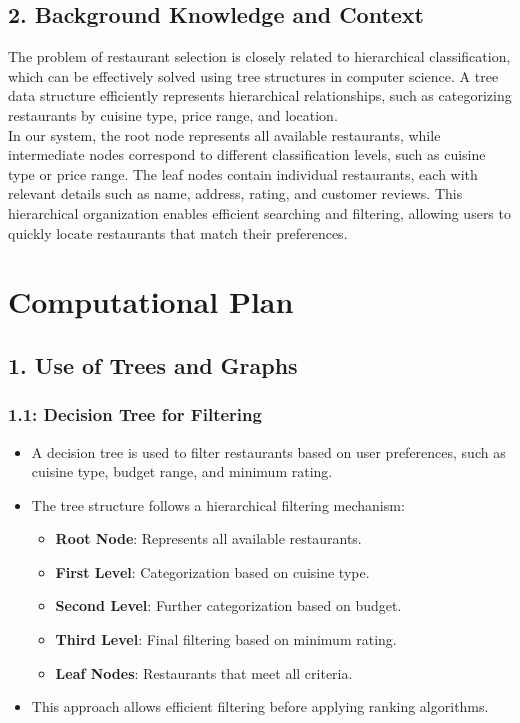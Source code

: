 \documentclass[fontsize=11pt]{article}
\begin{document}
\subsection*{2. Background Knowledge and Context}
The problem of restaurant selection is closely related to hierarchical classification, which can be effectively solved using tree structures in computer science. A tree data structure efficiently represents hierarchical relationships, such as categorizing restaurants by cuisine type, price range, and location. \\
In our system, the root node represents all available restaurants, while intermediate nodes correspond to different classification levels, such as cuisine type or price range. The leaf nodes contain individual restaurants, each with relevant details such as name, address, rating, and customer reviews. This hierarchical organization enables efficient searching and filtering, allowing users to quickly locate restaurants that match their preferences.


\section*{Computational Plan}

\subsection*{1. Use of Trees and Graphs}

\subsubsection*{1.1: Decision Tree for Filtering}
\begin{itemize}
    \item A decision tree is used to filter restaurants based on user preferences, such as cuisine type, budget range, and minimum rating.
    \item The tree structure follows a hierarchical filtering mechanism: 
    \begin{itemize}
        \item \textbf{Root Node}: Represents all available restaurants.
        \item \textbf{First Level}: Categorization based on cuisine type.
        \item \textbf{Second Level}: Further categorization based on budget.
        \item \textbf{Third Level}: Final filtering based on minimum rating.
        \item \textbf{Leaf Nodes}: Restaurants that meet all criteria.
    \end{itemize}
    \item This approach allows efficient filtering before applying ranking algorithms.
\end{itemize}
\end{document}
